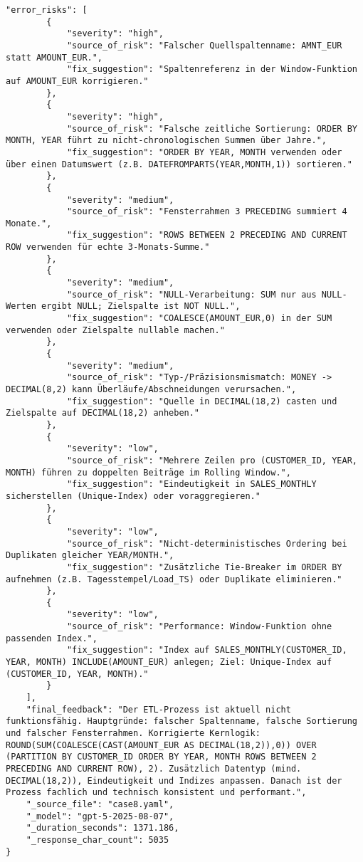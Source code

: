 \begin{lstlisting}[caption={Ausgabe: GPT-5 Anwendungsfall 8 Robustheitsdurchlauf},label={gpt_case8_prompt3}]
    "error_risks": [
        {
            "severity": "high",
            "source_of_risk": "Falscher Quellspaltenname: AMNT_EUR statt AMOUNT_EUR.",
            "fix_suggestion": "Spaltenreferenz in der Window-Funktion auf AMOUNT_EUR korrigieren."
        },
        {
            "severity": "high",
            "source_of_risk": "Falsche zeitliche Sortierung: ORDER BY MONTH, YEAR führt zu nicht-chronologischen Summen über Jahre.",
            "fix_suggestion": "ORDER BY YEAR, MONTH verwenden oder über einen Datumswert (z.B. DATEFROMPARTS(YEAR,MONTH,1)) sortieren."
        },
        {
            "severity": "medium",
            "source_of_risk": "Fensterrahmen 3 PRECEDING summiert 4 Monate.",
            "fix_suggestion": "ROWS BETWEEN 2 PRECEDING AND CURRENT ROW verwenden für echte 3-Monats-Summe."
        },
        {
            "severity": "medium",
            "source_of_risk": "NULL-Verarbeitung: SUM nur aus NULL-Werten ergibt NULL; Zielspalte ist NOT NULL.",
            "fix_suggestion": "COALESCE(AMOUNT_EUR,0) in der SUM verwenden oder Zielspalte nullable machen."
        },
        {
            "severity": "medium",
            "source_of_risk": "Typ-/Präzisionsmismatch: MONEY -> DECIMAL(8,2) kann Überläufe/Abschneidungen verursachen.",
            "fix_suggestion": "Quelle in DECIMAL(18,2) casten und Zielspalte auf DECIMAL(18,2) anheben."
        },
        {
            "severity": "low",
            "source_of_risk": "Mehrere Zeilen pro (CUSTOMER_ID, YEAR, MONTH) führen zu doppelten Beiträge im Rolling Window.",
            "fix_suggestion": "Eindeutigkeit in SALES_MONTHLY sicherstellen (Unique-Index) oder voraggregieren."
        },
        {
            "severity": "low",
            "source_of_risk": "Nicht-deterministisches Ordering bei Duplikaten gleicher YEAR/MONTH.",
            "fix_suggestion": "Zusätzliche Tie-Breaker im ORDER BY aufnehmen (z.B. Tagesstempel/Load_TS) oder Duplikate eliminieren."
        },
        {
            "severity": "low",
            "source_of_risk": "Performance: Window-Funktion ohne passenden Index.",
            "fix_suggestion": "Index auf SALES_MONTHLY(CUSTOMER_ID, YEAR, MONTH) INCLUDE(AMOUNT_EUR) anlegen; Ziel: Unique-Index auf (CUSTOMER_ID, YEAR, MONTH)."
        }
    ],
    "final_feedback": "Der ETL-Prozess ist aktuell nicht funktionsfähig. Hauptgründe: falscher Spaltenname, falsche Sortierung und falscher Fensterrahmen. Korrigierte Kernlogik: ROUND(SUM(COALESCE(CAST(AMOUNT_EUR AS DECIMAL(18,2)),0)) OVER (PARTITION BY CUSTOMER_ID ORDER BY YEAR, MONTH ROWS BETWEEN 2 PRECEDING AND CURRENT ROW), 2). Zusätzlich Datentyp (mind. DECIMAL(18,2)), Eindeutigkeit und Indizes anpassen. Danach ist der Prozess fachlich und technisch konsistent und performant.",
    "_source_file": "case8.yaml",
    "_model": "gpt-5-2025-08-07",
    "_duration_seconds": 1371.186,
    "_response_char_count": 5035
}
\end{lstlisting}

